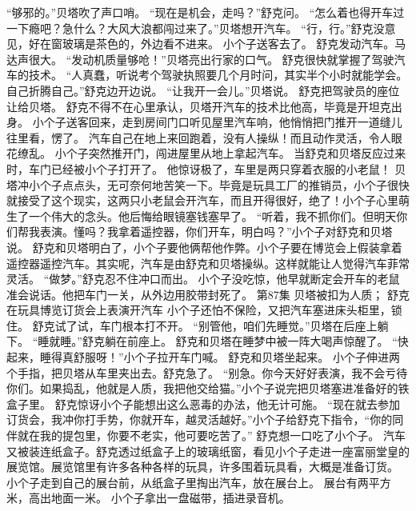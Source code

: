 \documentclass[a4paper,12pt,UTF8,twoside]{ctexbook}
\begin{document}
        “够邪的。”贝塔吹了声口哨。 
        “现在是机会，走吗？”舒克问。 
        “怎么着也得开车过一下瘾吧？急什么？大风大浪都闯过来了。”贝塔想开汽车。 
        “行，行。”舒克没意见，好在窗玻璃是茶色的，外边看不进来。 
        小个子送客去了。 
        舒克发动汽车。马达声很大。 
        “发动机质量够呛！”贝塔亮出行家的口气。 
        舒克很快就掌握了驾驶汽车的技术。 
        “人真蠢，听说考个驾驶执照要几个月时问，其实半个小时就能学会。自己折腾自己。”舒克边开边说。 
        “让我开一会儿。”贝塔说。 
        舒克把驾驶员的座位让给贝塔。 
        舒克不得不在心里承认，贝塔开汽车的技术比他高，毕竟是开坦克出身。 
        小个子送客回来，走到房间门口听见屋里汽车响，他悄悄把门推开一道缝儿往里看，愣了。 
        汽车自己在地上来回跑着，没有人操纵！而且动作灵活，令人眼花缭乱。 
        小个子突然推开门，闯进屋里从地上拿起汽车。 
        当舒克和贝塔反应过来时，车门已经被小个子打开了。 
        他惊讶极了，车里是两只穿着衣服的小老鼠！ 
        贝塔冲小个子点点头，无可奈何地苦笑一下。毕竟是玩具工厂的推销员，小个子很快就接受了这个现实，这两只小老鼠会开汽车，而且开得很好，绝了！小个子心里萌生了一个伟大的念头。他后悔给眼镜塞钱塞早了。 
        “听着，我不抓你们。但明天你们帮我表演。懂吗？我拿着遥控器，你们开车，明白吗？”小个子对舒克和贝塔说。 
        舒克和贝塔明白了，小个子要他俩帮他作弊。小个子要在博览会上假装拿着遥控器遥控汽车。其实呢，汽车是由舒克和贝塔操纵。这样就能让人觉得汽车菲常灵活。 
        “做梦。”舒克忍不住冲口而出。 
        小个子没吃惊，他早就断定会开车的老鼠准会说话。他把车门一关，从外边用胶带封死了。   第87集 
        贝塔被扣为人质； 
        舒克在玩具博览订货会上表演开汽车   
        小个子还怕不保险，又把汽车塞进床头柜里，锁住。 
        舒克试了试，车门根本打不开。 
        “别管他，咱们先睡觉。”贝塔在后座上躺下。 
        “睡就睡。”舒克躺在前座上。 
        舒克和贝塔在睡梦中被一阵大喝声惊醒了。 
        “快起来，睡得真舒服呀！”小个子拉开车门喊。 
        舒克和贝塔坐起来。 
        小个子伸进两个手指，把贝塔从车里夹出去。舒克急了。 
        “别急。你今天好好表演，我不会亏待你们。如果捣乱，他就是人质，我把他交给猫。”小个子说完把贝塔塞进准备好的铁盒子里。 
        舒克惊讶小个子能想出这么恶毒的办法，他无计可施。 
        “现在就去参加订货会，我冲你打手势，你就开车，越灵活越好。”小个子给舒克下指令，“你的同伴就在我的提包里，你要不老实，他可要吃苦了。” 
        舒克想一口吃了小个子。 
        汽车又被装连纸盒子。舒克透过纸盒子上的玻璃纸窗，看见小个子走进一座富丽堂皇的展览馆。展览馆里有许多各种各样的玩具，许多围着玩具看，大概是准备订货。 
        小个子走到自己的展台前，从纸盒子里掏出汽车，放在展台上。 
        展台有两平方米，高出地面一米。 
        小个子拿出一盘磁带，插进录音机。 
\end{document}
